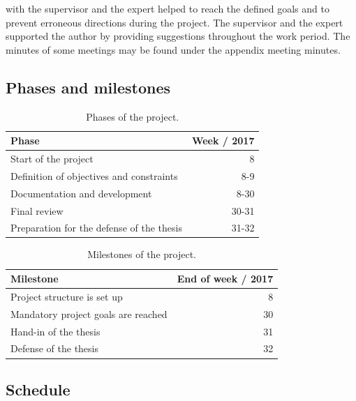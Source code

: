 \documentclass[%
    a4paper,    %
    justified,  %
    nobib,      %
    openany     %
]{tufte-book}
\makeatletter
\renewcommand{\label}[1]{\@tufte@label{##1}}%
\makeatother
\begin{document}
 with the supervisor and the expert helped to reach
the defined goals and to prevent erroneous directions during the project. The
supervisor and the expert supported the author by providing suggestions
throughout the work period. The minutes of some meetings may be
found under the appendix meeting minutes.~

\subsection{Phases and milestones}
\label{subsec:project-phases-milestones}

\begin{table}[h]
  \caption{Phases of the project.}
  \begin{tabularx}{\textwidth}{Xr}
    \toprule
    \textbf{Phase}   & \textbf{Week / 2017} \\
    \midrule
    Start of the project & 8 \\
    Definition of objectives and constraints & 8-9 \\
    Documentation and development & 8-30 \\
    Final review & 30-31 \\
    Preparation for the defense of the thesis & 31-32 \\
    \bottomrule
  \end{tabularx}
\end{table}

\begin{table}[h]
  \caption{Milestones of the project.}
  \begin{tabularx}{\textwidth}{Xr}
    \toprule
    \textbf{Milestone}   & \textbf{End of week / 2017} \\
    \midrule
    Project structure is set up & 8 \\
    Mandatory project goals are reached & 30 \\
    Hand-in of the thesis & 31 \\
    Defense of the thesis & 32 \\
    \bottomrule
  \end{tabularx}
\end{table}

\newpage{}

\subsection{Schedule}
\label{subsec:project-schedule}
\end{document}

